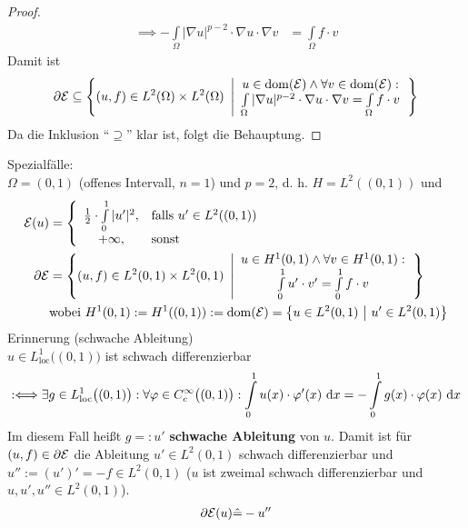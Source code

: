 \begin{beispiel}
\begin{proof}
\begin{align*}
\implies
-\int\limits_\Omega |\nabla u|^{p-2}\cdot\nabla u\cdot\nabla v&=\int\limits_\Omega f\cdot v
\end{align*}
Damit ist 
\begin{align*}
\partial\mathcal{E}\subseteq\left\lbrace(u,f)\in L^2(\Omega)\times L^2(\Omega)~\left|
\begin{array}{c}
u\in\operatorname{dom}(\mathcal{E})\wedge\forall v\in\operatorname{dom}(\mathcal{E}):\\
\int\limits_\Omega|\nabla u|^{p-2}\cdot\nabla u\cdot\nabla v=\int\limits_\Omega f\cdot v
\end{array}
\right.\right\rbrace
\end{align*}
Da die Inklusion ``$\supseteq$'' klar ist, folgt die Behauptung.
\end{proof}
Spezialfälle:\\
$\Omega=(0,1)$ (offenes Intervall, $n=1$) und $p=2$, d. h. $H=L^2((0,1))$ und 
\begin{align*}
\mathcal{E}(u)&=\left\lbrace\begin{array}{cl}
\frac{1}{2}\cdot\int\limits_0^1|u'|^2,&\text{falls } u'\in L^2((0,1))\\
+\infty, &\text{sonst }
\end{array}\right.\\
\partial\mathcal{E}&=\left\lbrace(u,f)\in L^2(0,1)\times L^2(0,1)~\left|
\begin{array}{c}
u\in H^1(0,1)\wedge\forall v\in H^1(0,1):\\
\int\limits_0^1 u'\cdot v'=\int\limits_0^1 f\cdot v
\end{array}
\right.\right\rbrace\\
&\text{wobei } H^1(0,1):=H^1((0,1)):=\operatorname{dom}(\mathcal{E})=\big\lbrace u\in L^2(0,1)~\big|~u'\in L^2(0,1)\big\rbrace
\end{align*}
Erinnerung (schwache Ableitung)\\
$u\in L^1_{\text{loc}}\big((0,1)\big)$ ist schwach differenzierbar
\begin{align*}
:\Longleftrightarrow\exists g\in L^1_{\text{loc}}\big((0,1)\big):\forall\varphi\in C_c^\infty\big((0,1)\big):
\int\limits_0^1 u(x)\cdot\varphi'(x)\text{ d} x=-\int\limits_0^1 g(x)\cdot\varphi(x)\text{ d} x
\end{align*}
Im diesem Fall heißt $g=:u'$ \textbf{schwache Ableitung} von $u$. Damit ist für $(u,f)\in\partial\mathcal{E}$ die Ableitung $u'\in L^2(0,1)$ schwach differenzierbar und $u'':=(u')'=-f\in L^2(0,1)$ ($u$ ist zweimal schwach differenzierbar und $u,u',u''\in L^2(0,1)$).
\begin{align*}
\partial\mathcal{E}(u)\hat{=}-u''
\end{align*}

\end{beispiel}

